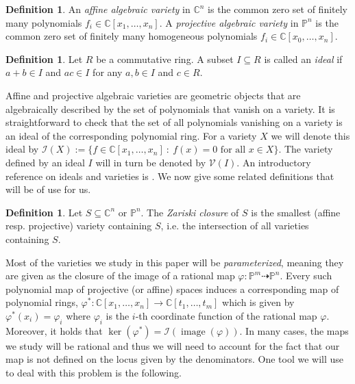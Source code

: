 \documentclass[12pt, reqno]{amsart}
\numberwithin{equation}{section}
\theoremstyle{plain}
\theoremstyle{definition}
\newtheorem{definition}[theorem]{Definition}
\newcommand{\cc}{\mathbb{C}}
\newcommand{\pp}{\mathbb{P}}
\newcommand{\ci}{\mathcal{I}}
\DeclareMathOperator{\image}{image}
\begin{document}
\begin{definition}
    An \emph{affine algebraic variety} in $\mathbb{C}^n$ is the common zero set of finitely many polynomials $f_i\in\mathbb{C}[x_1,\ldots,x_n]$. A \emph{projective algebraic variety} in $\mathbb{P}^n$ is the common zero set of finitely many homogeneous polynomials $f_i\in\mathbb{C}[x_0,\ldots,x_n]$.
\end{definition}  

\begin{definition}
    Let $R$ be a commutative ring. A subset $I\subseteq R$ is called an \emph{ideal} if $a+b\in I$ and $ac\in I$ for any $a,b\in I$ and $c\in R$. 
\end{definition}

Affine and projective algebraic varieties are geometric objects that are algebraically described by the set of polynomials that vanish on a variety. It is straightforward to check that the set of all polynomials vanishing on a variety is an ideal of the corresponding polynomial ring. For a variety $X$ we will denote this ideal by $\mathcal{I}(X) := \{f \in \cc[x_1, \ldots, x_n] ~:~ f(x) = 0 \text{ for all } x \in X\}$. The variety defined by an ideal $I$ will in turn be denoted by $\mathcal{V}(I)$. An introductory reference on ideals and varieties is \cite{cox1997ideals}. We now give some related definitions that will be of use for us. 


\begin{definition}
    Let $S\subseteq \mathbb{C}^n$ or $\mathbb{P}^n$. The \emph{Zariski closure} of $S$ is the smallest (affine resp. projective) variety containing $S$, i.e. the intersection of all varieties containing $S$. 
\end{definition}


Most of the varieties we study in this paper will be \emph{parameterized}, meaning they are given as the closure of the image of a rational map $\varphi: \pp^m \dashrightarrow \pp^n$. Every such polynomial map of projective (or affine) spaces induces a corresponding map of polynomial rings, $\varphi^\ast: \cc[x_1, \ldots, x_n] \to \cc[t_1, \ldots, t_m]$ which is given by $\varphi^\ast(x_i) = \varphi_i$ where $\varphi_i$ is the $i$-th coordinate function of the rational map $\varphi$. Moreover, it holds that $\ker(\varphi^\ast) = \ci(\image(\varphi))$. In many cases, the maps we study will be rational and thus we will need to account for the fact that our map is not defined on the locus given by the denominators. One tool we will use to deal with this problem is the following. 
\end{document}
